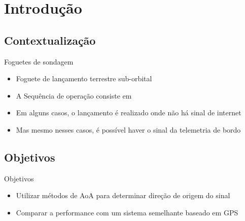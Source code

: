 \section{Introdução}

\subsection{Contextualização}

\begin{frame}{Foguetes de sondagem}
    \begin{itemize}[<+->]
        \item Foguete de lançamento terrestre sub-orbital
        \item A Sequência de operação consiste em 
        \item Em alguns casos, o lançamento é realizado onde não há sinal de internet
        \item Mas mesmo nesses casos, é possível haver o sinal da telemetria de bordo
    \end{itemize}
    \begin{center}
    \end{center}
\end{frame}

\subsection{Objetivos}
\begin{frame}{Objetivos}
    \begin{itemize}[<+->]
        \item Utilizar métodos de AoA para determinar direção de origem do sinal
        \item Comparar a performance com um sistema semelhante baseado em GPS
    \end{itemize}
\end{frame}
